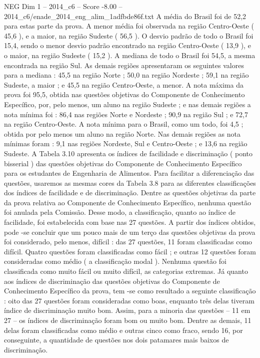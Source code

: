 \begin{textsample}{NEG Dim 1 – 2014\_c6 – Score -8.00 – 2014\_c6/enade\_2014\_eng\_alim\_1adfbde86f.txt}
A média do Brasil foi de 52,2 para estas parte da prova.
A menor média foi observada na região Centro-Oeste ( 45,6 ), e a maior, na região Sudeste ( 56,5 ).
O desvio padrão de todo o Brasil foi 15,4, sendo o menor desvio padrão encontrado na região Centro-Oeste ( 13,9 ), e o maior, na região Sudeste ( 15,2 ).
A mediana de todo o Brasil foi 54,5, a mesma encontrada na região Sul.
As demais regiões apresentaram os seguintes valores para a mediana : 45,5 na região Norte ; 50,0 na região Nordeste ; 59,1 na região Sudeste, a maior ; e 45,5 na região Centro-Oeste, a menor.
A nota máxima da prova foi 95,5, obtida nas questões objetivas do Componente de Conhecimento Específico, por, pelo menos, um aluno na região Sudeste ; e nas demais regiões a nota mínima foi : 86,4 nas regiões Norte e Nordeste ; 90,9 na região Sul ; e 72,7 na região Centro-Oeste.
A nota mínima para o Brasil, como um todo, foi 4,5 ; obtida por pelo menos um aluno na região Norte.
Nas demais regiões as nota mínimas foram : 9,1 nas regiões Nordeste, Sul e Centro-Oeste ; e 13,6 na região Sudeste.
A Tabela 3.10 apresenta os índices de facilidade e discriminação ( ponto bisserial ) das questões objetivas do Componente de Conhecimento Específico para os estudantes de Engenharia de Alimentos.
Para facilitar a diferenciação das questões, usaremos as mesmas cores da Tabela 3.8 para as diferentes classificações dos índices de facilidade e de discriminação.
Dentre as questões objetivas da parte da prova relativa ao Componente de Conhecimento Específico, nenhuma questão foi anulada pela Comissão.
Desse modo, a classificação, quanto ao índice de facilidade, foi estabelecida com base nas 27 questões.
A partir dos índices obtidos, pode -se concluir que um pouco mais de um terço das questões objetivas da prova foi considerado, pelo menos, difícil : das 27 questões, 11 foram classificadas como difícil.
Quatro questões foram classificadas como fácil ; e outras 12 questões foram consideradas como médio ( a classificação modal ).
Nenhuma questão foi classificada como muito fácil ou muito difícil, as categorias extremas.
Já quanto aos índices de discriminação das questões objetivas do Componente de Conhecimento Específico da prova, tem -se como resultado a seguinte classificação : oito das 27 questões foram consideradas como boas, enquanto três delas tiveram índice de discriminação muito bom.
Assim, para a minoria das questões – 11 em 27 – os índices de discriminação foram bom ou muito bom.
Dentre as demais, 11 delas foram classificadas como médio e outras cinco como fraco, sendo 16, por conseguinte, a quantidade de questões nos dois patamares mais baixos de discriminação.

\end{textsample}
